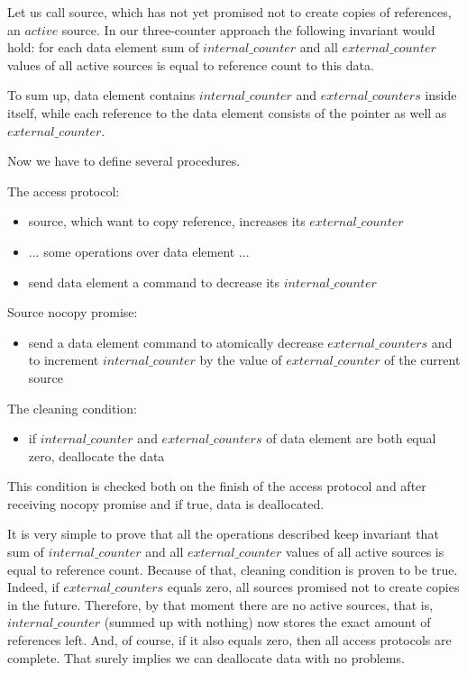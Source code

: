 \documentclass{article}
\begin{document}
Let us call source, which has not yet promised not to create copies of references, an $active$ source. In our three-counter approach the following invariant would hold: for each data element sum of  $internal\_counter$ and all $external\_counter$ values of all active sources is equal to reference count to this data.

To sum up, data element contains $internal\_counter$ and $external\_counters$ inside itself, while each reference to the data element consists of the pointer as well as $external\_counter$.

Now we have to define several procedures.

The access protocol:
\begin{itemize}
	\item source, which want to copy reference, increases its $external\_counter$
	\item ... some operations over data element ...
	\item send data element a command to decrease its $internal\_counter$
\end{itemize}

Source nocopy promise:
\begin{itemize}
	\item send a data element command to atomically decrease $external\_counters$ and to increment $internal\_counter$ by the value of $external\_counter$ of the current source
\end{itemize}

The cleaning condition:
\begin{itemize}
	\item if  $internal\_counter$ and $external\_counters$ of data element are both equal zero, deallocate the data
\end{itemize}

This condition is checked both on the finish of the access protocol and after receiving nocopy promise and if true, data is deallocated.

It is very simple to prove that all the operations described keep invariant that sum of $internal\_counter$ and all $external\_counter$ values of all active sources is equal to reference count. Because of that, cleaning condition is proven to be true. Indeed, if $external\_counters$ equals zero, all sources promised not to create copies in the future. Therefore, by that moment there are no active sources, that is, $internal\_counter$ (summed up with nothing) now stores the exact amount of references left. And, of course, if it also equals zero, then all access protocols are complete. That surely implies we can deallocate data with no problems.
\end{document}

